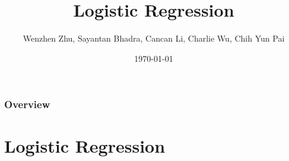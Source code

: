 \documentclass{beamer}
\title[Logistic Regression]{Logistic Regression} %
\author{Wenzhen Zhu, Sayantan Bhadra, Cancan Li, Charlie Wu, Chih Yun Pai} %
\institute[WUSTL] %
{
Washington University in St. Louis \\ %
\medskip
\textit{CSE 543T} %
}
\date{\today} %
\begin{document}
\begin{frame}
\titlepage %
\end{frame}

\begin{frame}
\frametitle{Overview} %
\tableofcontents %
\end{frame}
\section{Logistic Regression} 

\end{document}
